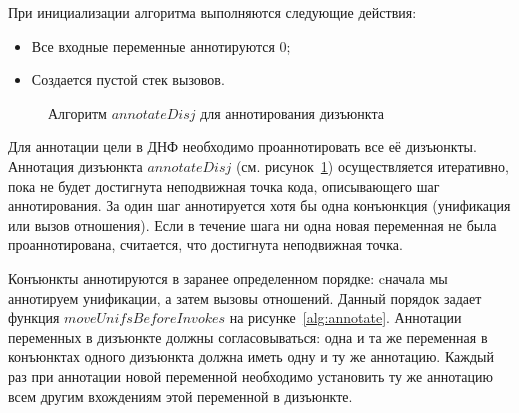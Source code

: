 При инициализации алгоритма выполняются следующие действия:
\begin{itemize}
    \item Все входные переменные аннотируются $0$;
    \item Создается пустой стек вызовов.
\end{itemize}

\begin{figure}[h!]
  \begin{center}
  \begin{minipage}{1.1\textwidth}
\begin{algorithm}[H]
\end{algorithm}
  \end{minipage}
  \end{center}
  \caption{Алгоритм $annotateDisj$ для аннотирования дизъюнкта}
  \label{alg:annotateDisj}
\end{figure}

Для аннотации цели в ДНФ необходимо проаннотировать все её дизъюнкты.
Аннотация дизъюнкта $annotateDisj$ (см. рисунок~\ref{alg:annotateDisj}) осуществляется итеративно, пока не будет достигнута неподвижная точка кода, описывающего шаг аннотирования.
За один шаг аннотируется хотя бы одна конъюнкция (унификация или вызов отношения).
Если в течение шага ни одна новая переменная не была проаннотирована, считается, что достигнута неподвижная точка.

Конъюнкты аннотируются в заранее определенном порядке: cначала мы аннотируем унификации, а затем вызовы отношений.
Данный порядок задает функция $moveUnifsBeforeInvokes$ на рисунке~\ref{alg:annotate}.
Аннотации переменных в дизъюнкте должны согласовываться: одна и та же переменная в конъюнктах одного дизъюнкта должна иметь одну и ту же аннотацию.
Каждый раз при аннотации новой переменной необходимо установить ту же аннотацию всем другим вхождениям этой переменной в дизъюнкте.

